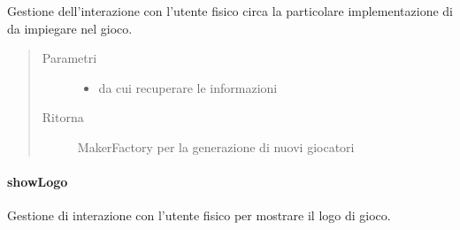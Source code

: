 \documentclass[letterpaper,10pt,italian,openany,oneside]{sphinxmanual}
\begin{document}
\begin{fulllineitems}
\label{\detokenize{source/it/unicam/cs/pa/mastermind/ui/StartView:it.unicam.cs.pa.mastermind.ui.StartView.setupMaker(MakerFactoryRegistry)}}
Gestione dell’interazione con l’utente fisico circa la particolare implementazione di  da impiegare nel gioco.
\begin{quote}\begin{description}
\item[{Parametri}] \leavevmode\begin{itemize}
\item {} 
 \textendash{} da cui recuperare le informazioni

\end{itemize}

\item[{Ritorna}] \leavevmode
MakerFactory per la generazione di nuovi giocatori 

\end{description}\end{quote}

\end{fulllineitems}



\paragraph{showLogo}
\label{\detokenize{source/it/unicam/cs/pa/mastermind/ui/StartView:showlogo}}

\begin{fulllineitems}
\label{\detokenize{source/it/unicam/cs/pa/mastermind/ui/StartView:it.unicam.cs.pa.mastermind.ui.StartView.showLogo()}}
Gestione di interazione con l’utente fisico per mostrare il logo di gioco.

\end{fulllineitems}
\end{document}
